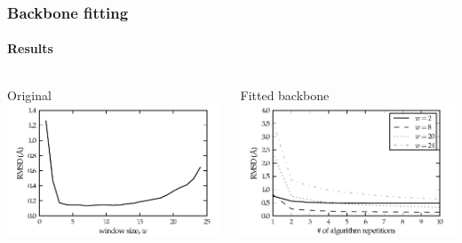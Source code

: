 \documentclass{beamer}
\begin{document}
\begin{frame}[t, fragile]
\frametitle{Backbone fitting} 
\framesubtitle{Results}
\begin{columns}[c]
\column{2in}
\centering
Original\\
\includegraphics[width=1\columnwidth]{plot_rmsd}

\column{2in}
\centering
Fitted backbone\\
\hspace*{-.4cm}\includegraphics[width=1\columnwidth]{plot_rmsd_convergence}
\end{columns}
\end{frame}
\end{document}
